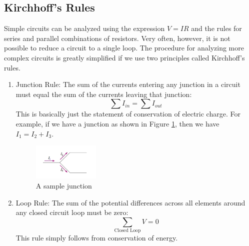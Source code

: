 \subsection{Kirchhoff's Rules}

Simple circuits can be analyzed using the expression $V = IR$ and the rules for series and parallel combinations of resistors. Very often, however, it is not possible to reduce a circuit to a single loop. The procedure for analyzing more complex circuits is greatly simplified if we use two principles called Kirchhoff's rules.\myskip

\begin{enumerate}
	\item Junction Rule: The sum of the currents entering any junction in a circuit must equal the sum of the currents leaving that junction:
	\begin{equation}
		\sum I_{in} = \sum I_{out}
	\end{equation}
	This is basically just the statement of conservation of electric charge. For example, if we have a junction as shown in Figure \ref{fig:junction}, then we have $I_1 = I_2 + I_3$.

	\begin{figure}[h]
	\centering
	\includegraphics[width=0.3\textwidth]{./Exp2/pic/junction.png}
	\caption{A sample junction}
	\label{fig:junction}
	\end{figure}

	\item Loop Rule: The sum of the potential differences across all elements around any closed circuit loop must be zero:
	\begin{equation}
		\sum_{\text{Closed Loop}} V = 0
	\end{equation}
	This rule simply follows from conservation of energy.

\end{enumerate}

